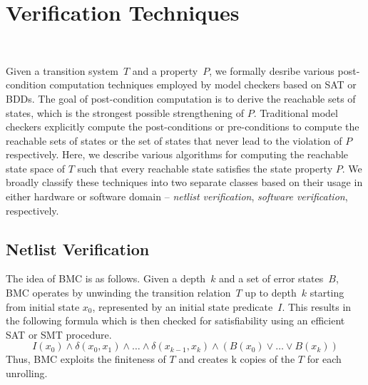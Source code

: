 \section{Verification Techniques}~\label{methodology}

Given a transition system~$T$ and a property~$P$, we formally desribe 
various post-condition computation techniques employed by
model checkers based on SAT or BDDs.  The goal of post-condition computation
is to derive the reachable sets of states, which is the strongest possible
strengthening of $P$.  Traditional model checkers explicitly compute the
post-conditions or pre-conditions to compute the reachable sets of states or
the set of states that never lead to the violation of $P$ respectively. 
Here, we describe various algorithms for computing the reachable state space
of $T$ such that every reachable state satisfies the state property $P$. We 
broadly classify these techniques into two separate classes based on their 
usage in either hardware or software domain -- \emph{netlist verification}, 
\emph{software verification}, respectively. 

\subsection{Netlist Verification}
%
%
The idea of BMC is as follows. 
Given a depth~$k$ and a set of error states~$B$, BMC operates
by unwinding the transition relation~$T$ up to depth~$k$ starting from
initial state $x_0$, represented by an initial state predicate~$I$.
This results in the following formula which is then checked for
satisfiability using an efficient SAT or SMT procedure.
%
\[ I(x_0) \wedge \delta(x_0, x_1) \wedge \ldots 
   \wedge \delta(x_{k-1}, x_k) \wedge (B(x_0) \vee \ldots \vee B(x_k)) \]
%
Thus, BMC exploits the finiteness of $T$ and creates k copies of the
$T$ for each unrolling.

